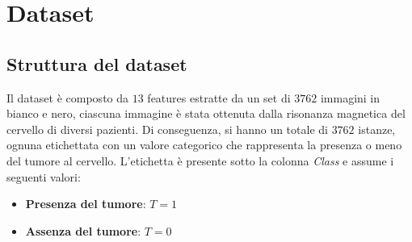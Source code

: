 \chapter{Dataset}
\section{Struttura del dataset}
Il dataset è composto da $13$ features estratte da un set di $3762$ immagini in bianco e nero, 
ciascuna immagine è stata ottenuta dalla risonanza magnetica del cervello di diversi pazienti. 
Di conseguenza, si hanno un totale di $3762$ istanze, ognuna etichettata con un 
valore categorico che rappresenta la presenza o meno del tumore al cervello.
L'etichetta è presente sotto la colonna \textit{Class} e assume i seguenti valori:
\begin{itemize}
      \item \textbf{Presenza del tumore}: $T = 1$
      \item \textbf{Assenza del tumore}: $T = 0$
\end{itemize}

